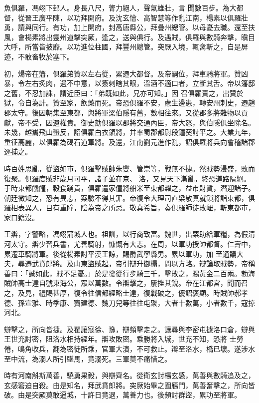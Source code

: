 \begin{pinyinscope}
 魚俱羅，馮翊下邽人。身長八尺，膂力絕人，聲氣雄壯，言
 聞數百步。為大都督，從晉王廣平陳，以功拜開府。及沈玄懀、高智慧等作亂江南，楊素以俱羅壯勇，請與同行。有功，加上開府，封高唐縣公，拜疊州總管。以母憂去職。還至扶風，會楊素將出靈州道擊突厥，逢之，送與俱行。及遇賊，俱羅與數騎奔擊，瞋目大呼，所當皆披靡。以功進位柱國，拜豐州總管。突厥入境，輒禽斬之，自是屏迹，不敢畜牧於塞下。



 初，煬帝在籓，俱羅弟贊以左右從，累遷大都督。及帝嗣位，拜車騎將軍。贊凶暴，令左右炙肉，遇不中意，以簽刺瞎其眼，溫酒不適口者，立斷其舌。帝以籓邸之舊，不忍加誅，謂近臣曰：「弟既如此，兄亦可知。」因
 召俱羅責之，出贊於獄，令自為計。贊至家，飲藥而死。帝恐俱羅不安，慮生邊患，轉安州刺史，遷趙郡太守。後因朝集至東都，與將軍梁伯隱有舊，數相往來。又從郡多將雜物以貢獻，帝不受，因遺權貴。御史劾俱羅以郡將交通內臣，帝大怒，與伯隱俱坐除名。未幾，越巂飛山蠻反，詔俱羅白衣領將，并率蜀郡都尉段鐘葵討平之。大業九年，重征高麗，以俱羅為碣石道軍將。及還，江南劉元進作亂，詔俱羅將兵向會稽諸郡逐捕之。



 時百姓思亂，從盜如市，俱羅擊賊帥朱燮、管崇等，戰無不捷。然賊勢浸盛，敗而復聚。俱羅度賊非歲月可平，諸子並在京、
 洛，又見天下漸亂，終恐道路隔絕。于時東都饑饉，穀食踴貴，俱羅遣家僮將船米至東都糶之，益市財貨，潛迎諸子。朝廷微知之，恐有異志，案驗不得其罪。帝復令大理司直梁敬真就鎖將詣東都，俱羅相表異人，目有重瞳，陰為帝之所忌。敬真希旨，奏俱羅師徒敗衄，斬東都市，家口籍沒。



 王辯，字警略，馮翊蒲城人也。祖訓，以行商致富。魏世，出粟助給軍糧，為假清河太守。辯少習兵書，尤善騎射，慷慨有大志。在周，以軍功授帥都督。仁壽中，累遷車騎將軍。後從楊素討平漢王諒，賜爵武寧縣男。累以軍功，加
 至通議大夫，尋遷武賁郎將。及山東盜賊起，帝引辯升御榻，問以方略。辯論取賊勢，帝稱善曰：「誠如此，賊不足憂。」於是發從行步騎三千，擊敗之，賜黃金二百兩。勃海賊帥高士達自號東海公，眾以萬數。令辯擊之，屢挫其銳。帝在江都宮，聞而召之，及見，禮賜甚厚，復令往信都經略士達，復戰破之，優詔褒顯。時賊帥郝孝德、孫宣雅、時季康、竇建德、魏刀兒等往往屯聚，大者十數萬，小者數千，寇掠河北。



 辯擊之，所向皆捷。及翟讓寇徐、豫，辯頻擊走之。讓尋與李密屯據洛口倉，辯與王世充討密，阻洛水相持經年。辯攻敗密。乘勝將入城，世充不知，恐將
 士勞倦，鳴角收兵，翻為密徒所乘，官軍大潰，不可救止。辯至洛水，橋已壞。遂涉水至中流，為溺人所引墜馬，竟溺死。三軍莫不痛惜之。



 時有河南斛斯萬善，驍勇果毅，與辯齊名。從衛玄討楊玄感，萬善與數騎追及之，玄感窘迫自殺。由是知名，拜武賁郎將。突厥始畢之圍鴈門，萬善奮擊之，所向皆破。由是突厥莫敢逼城，十許日竟退，萬善力也。後頻討群盜，累功至將軍。




\end{pinyinscope}
